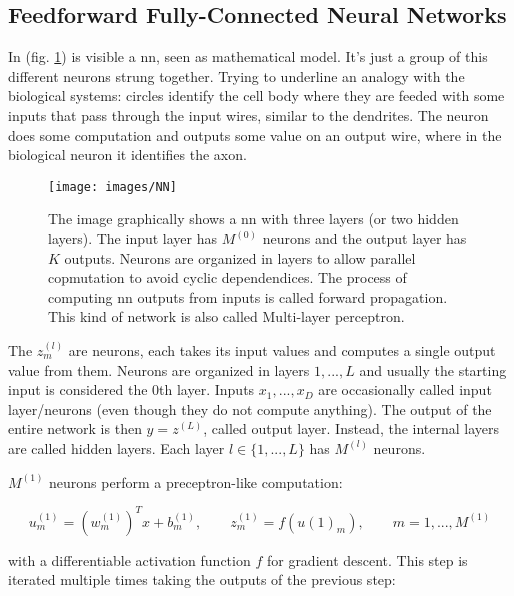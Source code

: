 \subsection{Feedforward Fully-Connected Neural Networks}
\label{nn:feedforward}

\noindent In (fig. \ref{fig:nn}) is visible a \gls{nn}, seen as mathematical model. It's just a group of this different neurons strung together. Trying to underline an analogy with the biological systems: circles identify the cell body where they are feeded with some inputs that pass through the input wires, similar to the dendrites. The neuron does some computation and outputs some value on an output wire, where in the biological neuron it identifies the axon.

\begin{figure}[H]
	\centering
	\texttt{[image: images/NN]}
	\caption[Feed forward neural network.]{The image graphically shows a \gls{nn} with three layers (or two hidden layers). The input layer has $M^{(0)}$ neurons and the output layer has $K$ outputs. Neurons are organized in  layers to allow parallel copmutation to avoid cyclic dependendices. The process of computing \gls{nn} outputs from inputs is called forward propagation. This kind of network is also called Multi-layer perceptron.}
	\label{fig:nn}
\end{figure}

\noindent The $z^{(l)}_m$ are neurons, each takes its input values and computes a single output value from them. Neurons are organized in layers $1,...,L$ and usually the starting input is considered the 0th layer. Inputs $x_1,...,x_D$ are occasionally called input layer/neurons (even though they do not compute anything). The output of the entire network is then $y=z^{(L)}$, called output layer. Instead, the internal layers are called hidden layers. Each layer $l\in \{1,...,L\}$ has $M^{(l)}$ neurons.

\noindent $M^{(1)}$ neurons perform a preceptron-like computation:

\begin{Equation}[H]
	\centering
	\begin{equation} \label{eq:neurbas}
		u^{(1)}_m = (w^{(1)}_m)^T x + b^{(1)}_m,  
		\quad \quad
		z^{(1)}_m = f(u{(1)}_m),
		\quad \quad
		m=1,...,M^{(1)}
	\end{equation}	
\end{Equation}

\noindent with a differentiable activation function $f$ for gradient descent. This step is iterated multiple times taking the outputs of the previous step:

